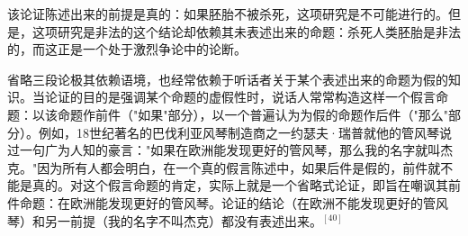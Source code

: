 该论证陈述出来的前提是真的：如果胚胎不被杀死，这项研究是不可能进行的。但是，这项研究是非法的这个结论却依赖其未表述出来的命题：杀死人类胚胎是非法的，而这正是一个处于激烈争论中的论断。

省略三段论极其依赖语境，也经常依赖于听话者关于某个表述出来的命题为假的知识。当论证的目的是强调某个命题的虚假性时，说话人常常构造这样一个假言命题：以该命题作前件（"如果"部分），以一个普遍认为为假的命题作后件（"那么"部分）。例如，18世纪著名的巴伐利亚风琴制造商之一约瑟夫·瑞普就他的管风琴说过一句广为人知的豪言："如果在欧洲能发现更好的管风琴，那么我的名字就叫杰克。"因为所有人都会明白，在一个真的假言陈述中，如果后件是假的，前件就不能是真的。对这个假言命题的肯定，实际上就是一个省略式论证，即旨在嘲讽其前件命题：在欧洲能发现更好的管风琴。论证的结论（在欧洲不能发现更好的管风琴）和另一前提（我的名字不叫杰克）都没有表述出来。${}^{[40]}$

